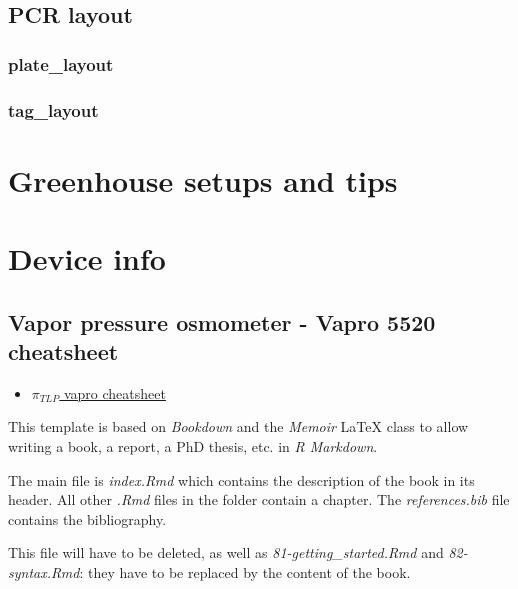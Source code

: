 \documentclass[
  12pt,
  american,
  a4paper,
  extrafontsizes,onecolumn,openright
  ]{memoir}
\providecommand{\tightlist}{%
  \setlength{\itemsep}{0pt}\setlength{\parskip}{0pt}}
\begin{document}
\hypertarget{pcr-layout}{%
\section{PCR layout}\label{pcr-layout}}

\hypertarget{plate_layout}{%
\subsection{plate\_layout}\label{plate_layout}}

\hypertarget{tag_layout}{%
\subsection{tag\_layout}\label{tag_layout}}

\hypertarget{greenhouse-setups-and-tips}{%
\chapter{Greenhouse setups and tips}\label{greenhouse-setups-and-tips}}

\hypertarget{device-info}{%
\chapter{Device info}\label{device-info}}

\hypertarget{vapor-pressure-osmometer---vapro-5520-cheatsheet}{%
\section{Vapor pressure osmometer - Vapro 5520 cheatsheet}\label{vapor-pressure-osmometer---vapro-5520-cheatsheet}}

\begin{itemize}
\tightlist
\item
  \href{./document/machine/Vapro\%205520/Vapro_cheatsheet.pdf}{\textbf{\(\pi_{TLP}\)} vapro cheatsheet}
\end{itemize}

This template is based on \emph{Bookdown} and the \emph{Memoir} LaTeX class to allow writing a book, a report, a PhD thesis, etc. in \emph{R Markdown}.

The main file is \emph{index.Rmd} which contains the description of the book in its header. All other \emph{.Rmd} files in the folder contain a chapter.
The \emph{references.bib} file contains the bibliography.

This file will have to be deleted, as well as \emph{81-getting\_started.Rmd} and \emph{82-syntax.Rmd}: they have to be replaced by the content of the book.
\end{document}
